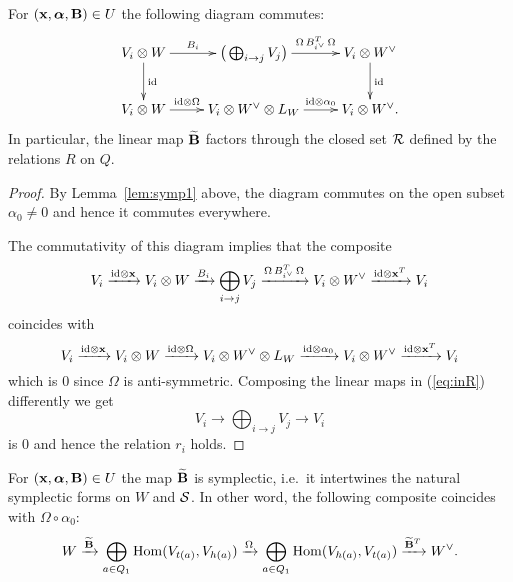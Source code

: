 \documentclass{amsart}
\newcommand{\balpha}{\boldsymbol{\alpha}}
\theoremstyle{definition}
\begin{document}
\begin{lemma}\label{lem:rela}
For $(\bfx, \balpha, \bfB) \in U$ the following diagram commutes:
\begin{equation}\label{eq:comdiag}
    \xymatrix{V_i \otimes W \ar[r]^-{B_i} \ar[d]^{\textup{id}} & \big(\bigoplus_{i \rightarrow j}  V_j\big) \ar[r]^-{\Omega\,B_{i^\vee}^T \, \Omega} & V_i \otimes W^\vee \ar[d]^{\textup{id}} \\
    V_i \otimes W \ar[r]^-{\textup{id} \otimes \Omega} & V_i \otimes W^\vee \otimes L_W \ar[r]^-{\textup{id} \otimes \alpha_0} & V_i \otimes W^\vee.}
\end{equation}
In particular, the linear map $\widetilde{\mathbf{B}}$ factors through the closed set $\mathcal{R}$ defined by the relations $R$ on $Q$.
\end{lemma}

\begin{proof}
By Lemma~\ref{lem:symp1} above, the diagram commutes on the open subset $\alpha_0 \neq 0$ and hence it commutes everywhere.

The commutativity of this diagram implies that the composite 
\begin{equation}\label{eq:inR}
    V_{i} \xrightarrow{\textup{id} \otimes \mathbf{x}} V_{i} \otimes W \xrightarrow{B_{i}} \bigoplus_{i \rightarrow j} V_j \xrightarrow{\Omega\,B_{i^\vee}^T \, \Omega} V_{i} \otimes W^\vee \xrightarrow{\textup{id} \otimes \mathbf{x}^T} V_i
\end{equation}
coincides with
$$V_i \xrightarrow{\textup{id} \otimes \mathbf{x}} V_i \otimes W \xrightarrow{\textup{id} \otimes \Omega} V_i \otimes W^\vee \otimes L_W \xrightarrow{\textup{id} \otimes \alpha_0} V_i \otimes W^\vee \xrightarrow {\textup{id} \otimes \mathbf{x}^T} V_i$$ 
which is $0$ since $\Omega$ is anti-symmetric.
Composing the linear maps in (\ref{eq:inR}) differently we get $$V_i \longrightarrow \bigoplus_{i \rightarrow j} V_j \longrightarrow V_i$$
is 0 and hence the relation $r_i$ holds.
\end{proof}

\begin{lemma}\label{lem:symp2}
For $(\bfx, \balpha, \bfB) \in U$ the map $\widetilde{\mathbf{B}}$ is symplectic, i.e.\ it intertwines the natural symplectic forms on $W$ and $\mathcal{S}$.
In other word, the following composite coincides with $\Omega \circ \alpha_0$:
\begin{equation}
    W \xrightarrow{\widetilde{\mathbf{B}}} \bigoplus_{a \in Q_1} \operatorname{Hom}(V_{t(a)}, V_{h(a)}) \xrightarrow{\Omega} \bigoplus_{a \in Q_1} \operatorname{Hom}(V_{h(a)}, V_{t(a)}) \xrightarrow{\widetilde{\mathbf{B}}^T} W^\vee.
\end{equation}
\end{lemma}
\end{document}
